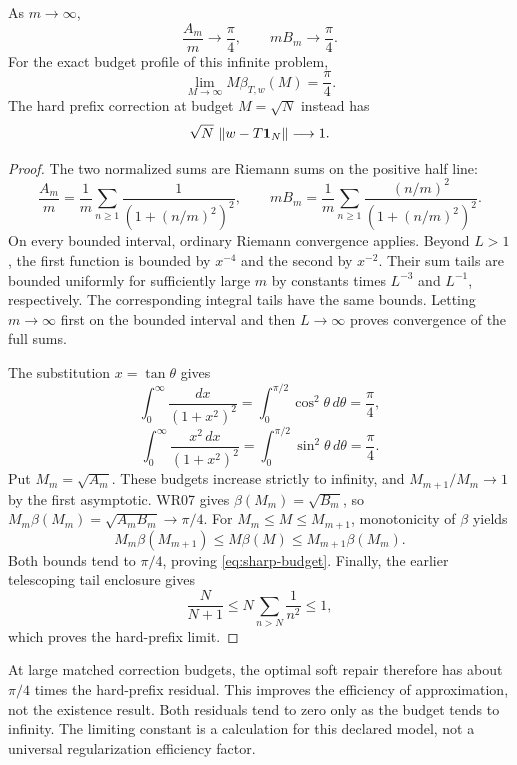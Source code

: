 \begin{theorem}\label{WR11}
As $m\to\infty$,
\[
 \frac{A_m}{m}\longrightarrow\frac\pi4,\qquad
 mB_m\longrightarrow\frac\pi4.
\]
For the exact budget profile of this infinite problem,
\begin{equation}\label{eq:sharp-budget}
 \lim_{M\to\infty}M\beta_{T,w}(M)=\frac\pi4.
\end{equation}
The hard prefix correction at budget $M=\sqrt N$ instead has
\[
 \sqrt N\,\left\lVert w-T\mathbf1_N\right\rVert\longrightarrow1.
\]
\end{theorem}
\begin{proof}
The two normalized sums are Riemann sums on the positive half line:
\[
 \frac{A_m}{m}=\frac1m\sum_{n\ge1}\frac1{(1+(n/m)^2)^2},\qquad
 mB_m=\frac1m\sum_{n\ge1}\frac{(n/m)^2}{(1+(n/m)^2)^2}.
\]
On every bounded interval, ordinary Riemann convergence applies. Beyond $L>1$, the first function is bounded by $x^{-4}$ and the second by $x^{-2}$. Their sum tails are bounded uniformly for sufficiently large $m$ by constants times $L^{-3}$ and $L^{-1}$, respectively. The corresponding integral tails have the same bounds. Letting $m\to\infty$ first on the bounded interval and then $L\to\infty$ proves convergence of the full sums.

The substitution $x=\tan\theta$ gives
\[
 \int_0^\infty\frac{dx}{(1+x^2)^2}
 =\int_0^{\pi/2}\cos^2\theta\,d\theta=\frac\pi4,
\]
\[
 \int_0^\infty\frac{x^2\,dx}{(1+x^2)^2}
 =\int_0^{\pi/2}\sin^2\theta\,d\theta=\frac\pi4.
\]
Put $M_m=\sqrt{A_m}$. These budgets increase strictly to infinity, and $M_{m+1}/M_m\to1$ by the first asymptotic. WR07 gives $\beta(M_m)=\sqrt{B_m}$, so
$M_m\beta(M_m)=\sqrt{A_mB_m}\to\pi/4$.
For $M_m\le M\le M_{m+1}$, monotonicity of $\beta$ yields
\[
 M_m\beta(M_{m+1})\le M\beta(M)\le M_{m+1}\beta(M_m).
\]
Both bounds tend to $\pi/4$, proving \eqref{eq:sharp-budget}. Finally, the earlier telescoping tail enclosure gives
\[
 \frac{N}{N+1}\le N\sum_{n>N}\frac1{n^2}\le1,
\]
which proves the hard-prefix limit.
\end{proof}

At large matched correction budgets, the optimal soft repair therefore has about $\pi/4$ times the hard-prefix residual. This improves the efficiency of approximation, not the existence result. Both residuals tend to zero only as the budget tends to infinity. The limiting constant is a calculation for this declared model, not a universal regularization efficiency factor.

